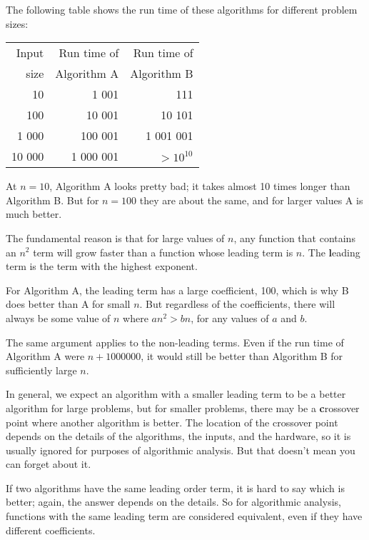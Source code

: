 \documentclass[
DIV=11,
fontsize=12,
twoside,
headinclude=false,
titlepage=firstiscover,
abstract=true,
headsepline=true,
footsepline=true,
chapterprefix=true, %
headings=big,
bibliography=totoc,%
captions=tableheading
]{scrbook}
\theoremstyle{definition}
\begin{document}
The following table shows the run time of these algorithms
for different problem sizes:

\begin{tabular}{|r|r|r|}
\hline
Input     &   Run time of     & Run time of \\
size      &   Algorithm A     & Algorithm B \\
\hline
10        &   1 001           & 111         \\
100       &   10 001          & 10 101         \\
1 000     &   100 001         & 1 001 001         \\
10 000    &   1 000 001       & $> 10^{10}$         \\
\hline
\end{tabular}

At $n=10$, Algorithm A looks pretty bad; it takes almost 10 times
longer than Algorithm B.  But for $n=100$ they are about the same, and
for larger values A is much better.

The fundamental reason is that for large values of $n$, any function
that contains an $n^2$ term will grow faster than a function whose
leading term is $n$.  The {\textbf leading term} is the term with the
highest exponent.

For Algorithm A, the leading term has a large coefficient, 100, which
is why B does better than A for small $n$.  But regardless of the
coefficients, there will always be some value of $n$ where
$a n^2 > b n$, for any values of $a$ and $b$.

The same argument applies to the non-leading terms.  Even if the run
time of Algorithm A were $n+1000000$, it would still be better than
Algorithm B for sufficiently large $n$.

In general, we expect an algorithm with a smaller leading term to be a
better algorithm for large problems, but for smaller problems, there
may be a {\textbf crossover point} where another algorithm is better.  The
location of the crossover point depends on the details of the
algorithms, the inputs, and the hardware, so it is usually ignored for
purposes of algorithmic analysis.  But that doesn't mean you can forget
about it.

If two algorithms have the same leading order term, it is hard to say
which is better; again, the answer depends on the details.  So for
algorithmic analysis, functions with the same leading term
are considered equivalent, even if they have different coefficients.
\end{document}
